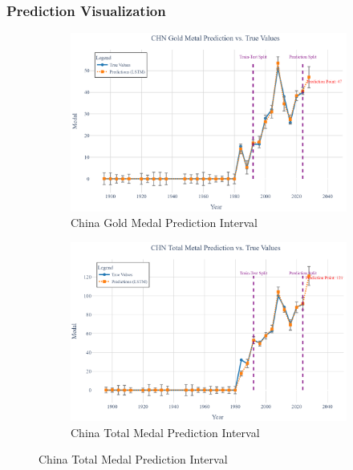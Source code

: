 \documentclass{mcmthesis}
\begin{document}
\subsubsection{Prediction Visualization}

\begin{figure}[H]
	\centering
	\begin{subfigure}[b]{0.48\textwidth}
		\includegraphics[width=\textwidth]{fig/CHN_gold_bar.png}
		\caption{China Gold Medal Prediction Interval}
		\label{fig:chn_gold}
	\end{subfigure}
	\hfill
	\begin{subfigure}[b]{0.48\textwidth}
		\includegraphics[width=\textwidth]{fig/CHN_total_bar.png}
		\caption{China Total Medal Prediction Interval}
		\label{fig:chn_total}
	\end{subfigure}
	

\end{figure}
\end{document}
